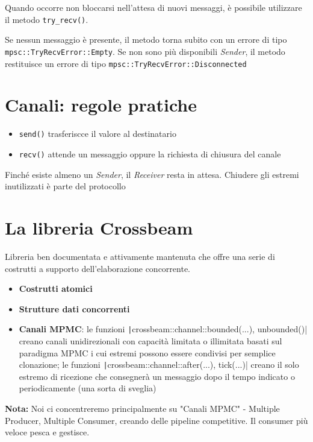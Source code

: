 Quando occorre non bloccarsi nell'attesa di nuovi messaggi, è possibile utilizzare il
metodo \verb|try_recv()|.

Se nessun messaggio è presente, il metodo torna subito con un errore di tipo \verb|mpsc::TryRecvError::Empty|.
Se non sono più disponibili \textit{Sender}, il metodo restituisce un errore di tipo \verb|mpsc::TryRecvError::Disconnected|



\section{Canali: regole pratiche}

\begin{itemize}
  \item \verb|send()| trasferiscce il valore al destinatario
  \item \verb|recv()| attende un messaggio oppure la richiesta di chiusura del canale
\end{itemize}

Finché esiste almeno un \textit{Sender}, il \textit{Receiver} resta in attesa.
Chiudere gli estremi inutilizzati è parte del protocollo



\section{La libreria Crossbeam}
Libreria ben documentata e attivamente mantenuta che offre una serie di costrutti a
supporto dell'elaborazione concorrente.

\begin{itemize}
  \item \textbf{Costrutti atomici}
  \item \textbf{Strutture dati concorrenti}
  \item \textbf{Canali MPMC}: le funzioni \texttt|crossbeam::channel::{bounded(...), unbounded()}|
        creano canali unidirezionali con capacità limitata o illimitata basati sul
        paradigma MPMC i cui estremi possono essere condivisi per semplice clonazione;
        le funzioni \texttt|crossbeam::channel::{after(...), tick(...)}| creano il solo estremo di ricezione che
        consegnerà un messaggio dopo il tempo indicato o periodicamente (una sorta di sveglia)
\end{itemize}

\begin{tcolorbox}
  \textbf{Nota:} Noi ci concentreremo principalmente su "Canali MPMC" - Multiple Producer, Multiple Consumer, creando delle pipeline competitive. Il consumer più veloce pesca e gestisce.
\end{tcolorbox}


